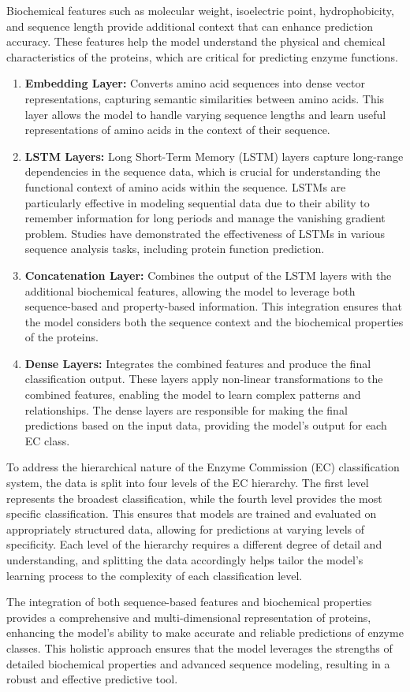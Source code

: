 Biochemical features such as molecular weight, isoelectric point, hydrophobicity, and sequence length provide additional context that can enhance prediction accuracy. These features help the model understand the physical and chemical characteristics of the proteins, which are critical for predicting enzyme functions.

\begin{enumerate}
    \item \textbf{Embedding Layer:} Converts amino acid sequences into dense vector representations, capturing semantic similarities between amino acids. This layer allows the model to handle varying sequence lengths and learn useful representations of amino acids in the context of their sequence.
    \item \textbf{LSTM Layers:} Long Short-Term Memory (LSTM) layers capture long-range dependencies in the sequence data, which is crucial for understanding the functional context of amino acids within the sequence. LSTMs are particularly effective in modeling sequential data due to their ability to remember information for long periods and manage the vanishing gradient problem. Studies have demonstrated the effectiveness of LSTMs in various sequence analysis tasks, including protein function prediction. \autocite{liuAttentionMechanismEnhanced2019}
    \item \textbf{Concatenation Layer:} Combines the output of the LSTM layers with the additional biochemical features, allowing the model to leverage both sequence-based and property-based information. This integration ensures that the model considers both the sequence context and the biochemical properties of the proteins.
    \item \textbf{Dense Layers:} Integrates the combined features and produce the final classification output. These layers apply non-linear transformations to the combined features, enabling the model to learn complex patterns and relationships. The dense layers are responsible for making the final predictions based on the input data, providing the model's output for each EC class.
\end{enumerate}

To address the hierarchical nature of the Enzyme Commission (EC) classification system, the data is split into four levels of the EC hierarchy. The first level represents the broadest classification, while the fourth level provides the most specific classification. This ensures that models are trained and evaluated on appropriately structured data, allowing for predictions at varying levels of specificity. Each level of the hierarchy requires a different degree of detail and understanding, and splitting the data accordingly helps tailor the model's learning process to the complexity of each classification level.

The integration of both sequence-based features and biochemical properties provides a comprehensive and multi-dimensional representation of proteins, enhancing the model's ability to make accurate and reliable predictions of enzyme classes. This holistic approach ensures that the model leverages the strengths of detailed biochemical properties and advanced sequence modeling, resulting in a robust and effective predictive tool.